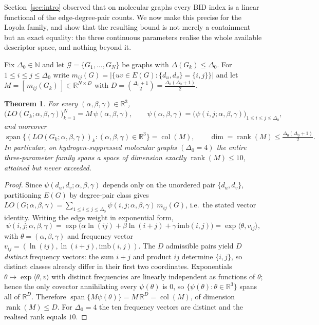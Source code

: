 \documentclass[a5paper, 10pt]{article}
\theoremstyle{plain}
\newtheorem{theorem}{Theorem}
\theoremstyle{remark}
\theoremstyle{definition}
\begin{document}
Section~\ref{sec:intro} observed that on molecular graphs every BID
index is a linear functional of the edge-degree-pair counts. We now
make this precise for the Loyola family, and show that the resulting
bound is not merely a containment but an exact equality: the three
continuous parameters realise the whole available descriptor space,
and nothing beyond it.

Fix $\Delta_0 \in \mathbb{N}$ and let
$\mathcal{G} = \{G_1, \dots, G_N\}$ be graphs with
$\Delta(G_k) \le \Delta_0$. For $1 \le i \le j \le \Delta_0$ write
$m_{ij}(G) = |\{uv \in E(G) : \{d_u, d_v\} = \{i, j\}\}|$ and let
$M = [\,m_{ij}(G_k)\,] \in \mathbb{R}^{N \times D}$ with
$D = \binom{\Delta_0 + 1}{2} = \tfrac{\Delta_0(\Delta_0 + 1)}{2}$.

\begin{theorem}\label{thm:saturation}
For every $(\alpha, \beta, \gamma) \in \mathbb{R}^3$,
\[
\bigl(LO(G_k; \alpha, \beta, \gamma)\bigr)_{k=1}^{N}
= M\,\psi(\alpha, \beta, \gamma),
\qquad
\psi(\alpha, \beta, \gamma)
= \bigl(\psi(i, j; \alpha, \beta, \gamma)\bigr)_{1 \le i \le j \le \Delta_0},
\]
and moreover
\[
\operatorname{span}\bigl\{(LO(G_k; \alpha, \beta, \gamma))_k :
(\alpha, \beta, \gamma) \in \mathbb{R}^3\bigr\}
= \operatorname{col}(M),
\qquad
\dim = \operatorname{rank}(M) \le \tfrac{\Delta_0(\Delta_0 + 1)}{2}.
\]
In particular, on hydrogen-suppressed molecular graphs
$(\Delta_0 = 4)$ the entire three-parameter family spans a space of
dimension exactly $\operatorname{rank}(M) \le 10$, attained but never
exceeded.
\end{theorem}

\begin{proof}
Since $\psi(d_u, d_v; \alpha, \beta, \gamma)$ depends only on the
unordered pair $\{d_u, d_v\}$, partitioning $E(G)$ by degree-pair
class gives
$LO(G; \alpha, \beta, \gamma)
= \sum_{1 \le i \le j \le \Delta_0} \psi(i, j; \alpha, \beta, \gamma)\,
m_{ij}(G)$, i.e.\ the stated vector identity. Writing the edge weight
in exponential form,
\[
\psi(i, j; \alpha, \beta, \gamma)
= \exp\!\bigl(\alpha \ln(ij) + \beta \ln(i + j)
+ \gamma\, \mathrm{imb}(i, j)\bigr)
= \exp\langle \theta, v_{ij} \rangle,
\]
with $\theta = (\alpha, \beta, \gamma)$ and frequency vector
$v_{ij} = (\ln(ij), \ln(i + j), \mathrm{imb}(i, j))$. The $D$
admissible pairs yield $D$ \emph{distinct} frequency vectors: the
sum $i + j$ and product $ij$ determine $\{i, j\}$, so distinct
classes already differ in their first two coordinates. Exponentials
$\theta \mapsto \exp\langle \theta, v \rangle$ with distinct
frequencies are linearly independent as functions of $\theta$; hence
the only covector annihilating every $\psi(\theta)$ is $0$, so
$\{\psi(\theta) : \theta \in \mathbb{R}^3\}$ spans all of
$\mathbb{R}^{D}$. Therefore
$\operatorname{span}\{M\psi(\theta)\} = M\,\mathbb{R}^{D}
= \operatorname{col}(M)$, of dimension $\operatorname{rank}(M) \le D$.
For $\Delta_0 = 4$ the ten frequency vectors are distinct and the
realised rank equals $10$.
\end{proof}
\end{document}
